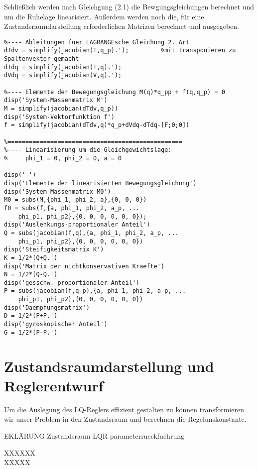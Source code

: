 \documentclass[a4paper, 10pt]{report}
\begin{document}
Schließlich werden nach Gleichgung (2.1) die Bewgungsgleichungen berechnet und um die Ruhelage linearisiert. Außerdem werden noch die, für eine Zustandsraumdarstellung erforderlichen Matrizen berechnet und ausgegeben.
\begin{lstlisting}
%---- Ableitungen fuer LAGRANGEsche Gleichung 2. Art
dTdv = simplify(jacobian(T,q_p).');         %mit transponieren zu Spaltenvektor gemacht
dTdq = simplify(jacobian(T,q).');
dVdq = simplify(jacobian(V,q).');

%---- Elemente der Bewegungsgleichung M(q)*q_pp + f(q,q_p) = 0
disp('System-Massenmatrix M')
M = simplify(jacobian(dTdv,q_p))
disp('System-Vektorfunktion f')
f = simplify(jacobian(dTdv,q)*q_p+dVdq-dTdq-[F;0;0])

%=================================================
%---- Linearisierung um die Gleichgewichtslage:
%     phi_1 = 0, phi_2 = 0, a = 0

disp(' ')
disp('Elemente der linearisierten Bewegungsgleichung')
disp('System-Massenmatrix M0')
M0 = subs(M,{phi_1, phi_2, a},{0, 0, 0})
f0 = subs(f,{a, phi_1, phi_2, a_p, ...
    phi_p1, phi_p2},{0, 0, 0, 0, 0, 0});
disp('Auslenkungs-proportionaler Anteil')
Q = subs(jacobian(f,q),{a, phi_1, phi_2, a_p, ...
    phi_p1, phi_p2},{0, 0, 0, 0, 0, 0})
disp('Steifigkeitsmatrix K')
K = 1/2*(Q+Q.')
disp('Matrix der nichtkonservativen Kraefte')
N = 1/2*(Q-Q.')
disp('gesschw.-proportionaler Anteil')
P = subs(jacobian(f,q_p),{a, phi_1, phi_2, a_p, ...
    phi_p1, phi_p2},{0, 0, 0, 0, 0, 0})
disp('Daempfungsmatrix')
D = 1/2*(P+P.')
disp('gyroskopischer Anteil')
G = 1/2*(P-P.')
 \end{lstlisting}

\section{Zustandsraumdarstellung und Reglerentwurf}
Um die Auslegung des LQ-Reglers effizient gestalten zu können transformieren wir unser Problem in den Zustandsraum und berechnen die Regelunskonstante. 

EKLÄRUNG Zustandsraum LQR parameterrueckfuehrung

XXXXXX \\
XXXXX \\
\end{document}
